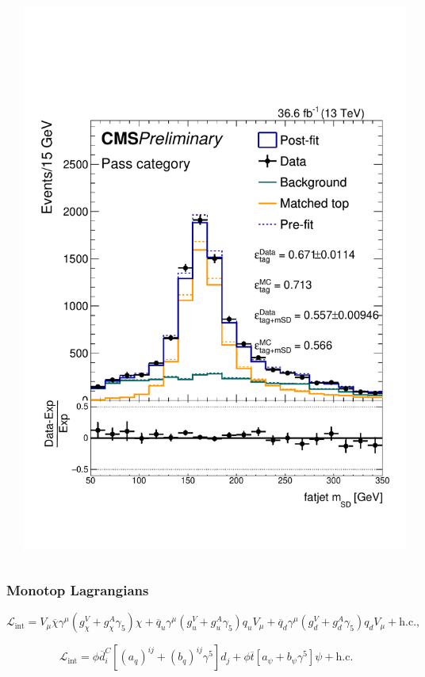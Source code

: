 \documentclass[aspectratio=169,xcolor=dvipsnames,,table,compress]{beamer}
\begin{document}
\begin{frame}
\begin{columns}
\begin{column}{0.25\textwidth}
    \end{column}
    \begin{column}{0.25\textwidth}
            \includegraphics[width=\textwidth]{../figures/toptagging/sf/loose_pass.pdf}
    \end{column}
  \end{columns}
\end{frame}

\begin{frame} \frametitle{Monotop Lagrangians}
  \[
\mathcal{L}_\text{int}=  V_\mu  \overline\chi \gamma^\mu (  g^V_{\chi} + g^A_{\chi} \gamma_5 ) \chi
                           + \overline{q}_u \gamma^\mu
                           ( g^V_u + g^A_u \gamma_5 ) q_u V_\mu
                           + \overline{q}_{d} \gamma^\mu
                           (  g^V_{d} + g^A_{d} \gamma_5 ) q_d V_\mu
                           + \text{h.c.},
   \]

   \[
    \mathcal{L}_\text{int} = \phi\overline{{d}}_i^C[(a_{q})^{ij}+(b_{q})^{ij}\gamma^5]{d}_j+\phi\overline{{t}}[a_{\psi}+b_{\psi}\gamma^5]\psi+\text{h.c.}
   \]
\end{frame}
\end{document}
